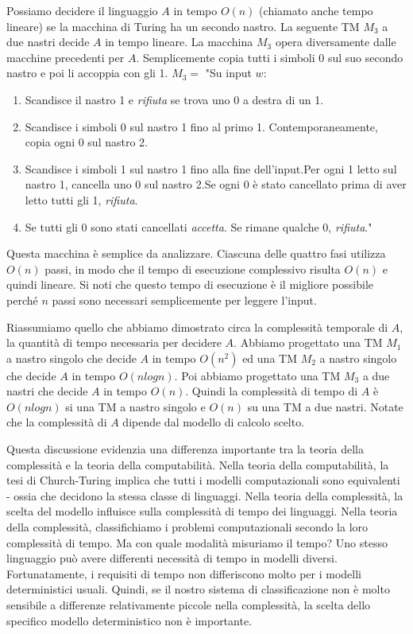 \documentclass{article}
\begin{document}
Possiamo decidere il linguaggio $A$ in tempo $O(n)$ (chiamato anche tempo lineare) se la macchina di Turing ha un secondo nastro.
La seguente TM $M_3$ a due nastri decide $A$ in tempo lineare.
La macchina $M_3$ opera diversamente dalle macchine precedenti per $A$.
Semplicemente copia tutti i simboli 0 sul suo secondo nastro e poi li accoppia con gli 1.
\vspace{1em}
\text{}
\newline
$M_3 =$ "Su input $w$:
\begin{enumerate}
    \item Scandisce il nastro 1 e \textit{rifiuta} se trova uno 0 a destra di un 1. 
    \item Scandisce i simboli 0 sul nastro 1 fino al primo 1. Contemporaneamente, copia ogni 0 sul nastro 2.
    \item Scandisce i simboli 1 sul nastro 1 fino alla fine dell'input.\newline Per ogni 1 letto sul nastro 1, cancella uno 0 sul nastro 2.\newline Se ogni 0 è stato cancellato prima di aver letto tutti gli 1, \textit{rifiuta}.
    \item Se tutti gli 0 sono stati cancellati \textit{accetta}. Se rimane qualche 0, \textit{rifiuta}."
\end{enumerate} 

Questa macchina è semplice da analizzare. 
Ciascuna delle quattro fasi utilizza $O(n)$ passi, in modo che il tempo di esecuzione complessivo risulta $O(n)$ e quindi lineare.
Si noti che questo tempo di esecuzione è il migliore possibile perché $n$ passi sono necessari semplicemente per leggere l'input.

Riassumiamo quello che abbiamo dimostrato circa la complessità temporale di $A$, la quantità di tempo necessaria per decidere $A$.
Abbiamo progettato una TM $M_1$ a nastro singolo che decide $A$ in tempo $O(n^2)$ ed una TM $M_2$ a nastro singolo che decide $A$ in tempo $O(nlogn)$.
Poi abbiamo progettato una TM $M_3$ a due nastri che decide $A$ in tempo $O(n)$.
Quindi la complessità di tempo di $A$ è $O(nlogn)$ si una TM a nastro singolo e $O(n)$ su una TM a due nastri.
Notate che la complessità di $A$ dipende dal modello di calcolo scelto.

Questa discussione evidenzia una differenza importante tra la teoria della complessità e la teoria della computabilità.
Nella teoria della computabilità, la tesi di Church-Turing implica che tutti i modelli computazionali sono equivalenti - ossia che decidono la stessa classe di linguaggi.
Nella teoria della complessità, la scelta del modello influisce sulla complessità di tempo dei linguaggi.
Nella teoria della complessità, classifichiamo i problemi computazionali secondo la loro complessità di tempo.
Ma con quale modalità misuriamo il tempo? 
Uno stesso linguaggio può avere differenti necessità di tempo in modelli diversi. 
Fortunatamente, i requisiti di tempo non differiscono molto per i modelli deterministici usuali.
Quindi, se il nostro sistema di classificazione non è molto sensibile a differenze relativamente piccole nella complessità, la scelta dello specifico modello deterministico non è importante.
\end{document}
